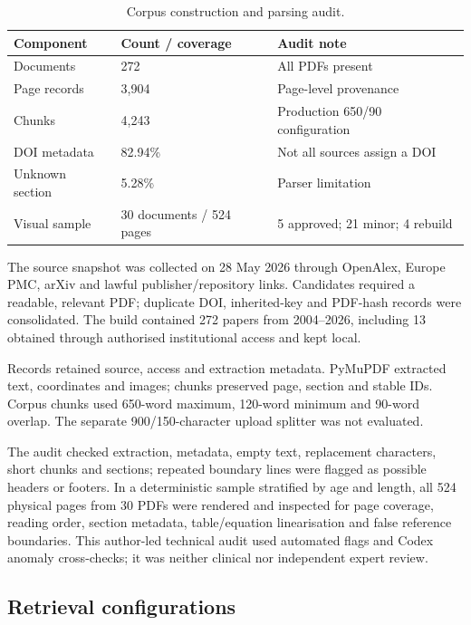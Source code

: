 \documentclass[11pt,a4paper]{article}
\newcommand{\code}[1]{\texttt{\detokenize{#1}}}
\begin{document}
\begin{table}[tbp]
  \centering
  \caption{Corpus construction and parsing audit.}
  \label{tab:corpus-audit}
  \small
  \begin{tabularx}{\linewidth}{@{}l l Y@{}}
    \toprule
    \textbf{Component} & \textbf{Count / coverage} & \textbf{Audit note} \\
    \midrule
    Documents & 272 & All PDFs present \\
    Page records & 3,904 & Page-level provenance \\
    Chunks & 4,243 & Production 650/90 configuration \\
    DOI metadata & 82.94\% & Not all sources assign a DOI \\
    Unknown section & 5.28\% & Parser limitation \\
    Visual sample & 30 documents / 524 pages & 5 approved; 21 minor; 4 rebuild \\
    \bottomrule
  \end{tabularx}
\end{table}

The source snapshot was collected on 28 May 2026 through OpenAlex, Europe PMC, arXiv and lawful publisher/repository links. Candidates required a readable, relevant PDF; duplicate DOI, inherited-key and PDF-hash records were consolidated. The build contained 272 papers from 2004--2026, including 13 obtained through authorised institutional access and kept local.

Records retained source, access and extraction metadata. PyMuPDF extracted text, coordinates and images; chunks preserved page, section and stable IDs. Corpus chunks used 650-word maximum, 120-word minimum and 90-word overlap. The separate 900/150-character upload splitter was not evaluated.

The audit checked extraction, metadata, empty text, replacement characters, short chunks and \code{Unknown} sections; repeated boundary lines were flagged as possible headers or footers. In a deterministic sample stratified by age and length, all 524 physical pages from 30 PDFs were rendered and inspected for page coverage, reading order, section metadata, table/equation linearisation and false reference boundaries. This author-led technical audit used automated flags and Codex anomaly cross-checks; it was neither clinical nor independent expert review.

\subsection{Retrieval configurations}
\label{sec:retrieval-configurations}
\end{document}
